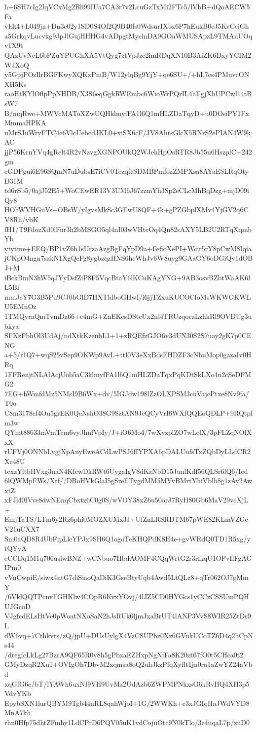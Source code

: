 h+6SH7cIg2IqVCxMg2Bli99IUa7CA3r7v2LcuGzTxMi2FTc5/lVbB+dQoAECW5Fa
vEk4+L049jn+Dn3e02y1SD0S4Of2Q9B40fs0WdsurIXbx6P7hEukB0cJ5KvCciGh
a5GrkqvLucvkg9JpJlGujHHHG4vADpgtMyclnDA9GOaWMUSApzL9TMAnUOqv1X9t
QAzUvNcL6bPZuYPUGhXA5VtQyg7ztVpJzc2imRDqXN10B3AiZK6DxyYCIM2WJXoQ
y5GpjPOzIlrBGFKwyXQKxPmB/W12ylqBg9YjY+qe6SU+/+hL7es4PMuvcONXH5Ks
raoHtKYlOflpPpNHDB/X3S6eqGgkRWEmbc6WioWrPQrIL4hEgjXhUPCwl14tBsW7
B/mqRwe+MWVcMAToXZwUQHklmyfFA1l6Q1mHLZDaTqyD+u0DOsiPY1FxMmmaHPKA
uMrSJuWrvFTC4e6VlcUebedJKL0+xiSX6cF/JV8AhrsGlcX5RNrS2ePIAN4W9kAC
jjP56KruYVq4gRelt4R2vNzvgXGNPOUkQ2WJehHpOsRTR8Jb55u6HszplC+242gm
eGDPgui6E96SQmN7uDubsE7iCV0TezqfcSDMBPmfozZMPXsa8AYaESLRqOtyD31M
td6rSb5/0ajJ52E5+WoCEwER13V3UM6J67zzmYh3Sp2eCLcMhBqDzg+mjD09iQy8
HOhWVHGuVs+OBsW/yIgvsMkSc3GEwU8QF+4k+gPZGbplXMv4YjGV2q6CV8Rh/vbK
fH1/T9FdozXd0lFur3h2bMSGO5ql4nI03wVHteOq4Qn82sAXY5LB2U2RTqXqmbYb
ytytme+EEQ/BP1vZ6h1sUrzaAzgBgFqYpD9a+FefioXePI+Wcir5rY8pCwM8Iqia
jCKpO4ngn7szkN1XgQcFg8ygbzqzHNS6hcWhJv6W8uyg9GAaGY6oDGiQv1dOBJ+M
iBckBmN3hW5qJYyDsfZiP8F5VqcBtaY6lKCuKAgYNG+9AB3osvBZbtWaAK6lL5Bf
mmJcY7G3B5Pu9CJ0bGlD7HXTldboGHwI/i6jjTZxuKUCOCfoMsWKWGKWLU5EMnOz
1TMQyraQmTvmDz66+e4mG+ZnEKesDStcUx2nl4TRUzqoczLzhkRl9OVDUg3ubkya
SFKzFbhOl3UdAj/ndXtkKzenbL1+1+zRQEfzGJO6v3dUN30S2S7uay2gK7p0CENG
a+5/r1Q7+wqS25vSep9OKWp9AvL+ttl0V3eXxBdsEHDZF3cNbuMop0gazaIv0HRq
1FFRenjtNLAlAcjUob5aC3klmyfFA1l6Q1mHLZDaTqxPqKDtSkLXo4n2cSeDFMG2
7EG+hWmfdMz5NMsI9B6Wx+dv/5IGJdw198lZzOLXPSM3cuVajcPtxe8Nv9fa/T0o
C8m3178cf4Ou5grEK0QeNshO38G9SztAN9JeQCyVrI6WXfQQEoQDLP+9RQtpfm3w
QYmt88633mVmTcm6vyJhnfVpIy/J+iO6Mo4/7wXvzplZO7wLelX/3pFLZqNOfXxX
rUFVj0ONNbLvgjXpAnyEweACdLwPSJ6fIYPXA6pDALUufsTxZQbDyLLdCR2Xe48U
tcxzYltbHVxg3uaN4KfcwDkRWt6UygaIgV8dKzNbD15JunlKdf56QLSr6lQ6/Ied
6lQWMpFWs/Xtf//DBoHVkGlaI5gSreETygdMM5MVvBMrtYhiVblh8g1zAy2AwxtZ
xFJl40IVve8dwNEnqCbxtz6C0g0S/wVOY38xZ6u50orJ7RyH80Gb6MaV29vcXjL+
EmjTaTS/LTm6y2Rz6phi0MOZXUMx3J+UfZnLRSRDTM67pWE82KLmVZGcV21uCXX7
Sm0aQD8R4UbFipLleYPJx9SH6Q1ogoTeKHQPdK8H4e+gvWRdQ0TD1R5xg/ytQYyA
eCCDq1M1q706uslwBNZ+wCNbuo7HbdAOMF4CQqWrtG2r3rfkqU1OPvIlFgAGIPm0
vVnCwpiE/siwx4ntG7diSiaoQaDiK3GseBtyUqb4Awd5LtQLz8+qTr062OJ7gMmY
/6VklQQTPcnvFGHKlw4COpR6KvxYOvj/4lJZ5CD0HYGcs1yCCzCSSUmPQHUJGcoD
VJgfcdELsHtVe0pWoatNXoSaN2hJsRUk6ljmJxaBrUT4lANP3VvS8WIR25ZtDs9L
dW6vq+7Cthkvts/zQ/jpU+DUsUylgX4VzCSUPbz0Xz6GVukUCoTZ6D4q2hCpNs44
/dregfcLkLg27BzrA9QF65R0v8h5gPbxaEZHxpNgNfFa8K20zt67fO0t5CHca0t2
GMyDzqR2Xu1+OVIgOh7DbvM2xqmsa8oQ2uhJkzPfqXyflt1jn0ra1aZwYZ24aVbd
xqGfG6e/bT/lYAWh6uxNI9VH9UvMz2UdAzb6ZWPMPNkxsG6kRvHQ4XH3p5VdvYKb
EpybSXN1lurQBYM9Tgb44nRL8qahWjoI+1G/2WWKh+c3xJGIqHaJWdVYD8MnA7kh
rhn0Hfp75dhtZFmhy1LdCPrD6PQV05uK1vdCojuOtc9N0kTlo/3e4uqaL7p/znD0
